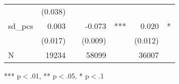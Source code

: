 \begin{table}[!h]
\begin{tabular}{lllllll}
  \multicolumn{1}{l}{} &
  \multicolumn{1}{r}{(0.038)} &
  \multicolumn{1}{l}{} \\
\multicolumn{1}{l}{sd\_pcs} &
  \multicolumn{1}{r}{0.003} &
  \multicolumn{1}{l}{} &
  \multicolumn{1}{r}{-0.073} &
  \multicolumn{1}{l}{***} &
  \multicolumn{1}{r}{0.020} &
  \multicolumn{1}{l}{*} \\
\multicolumn{1}{l}{} &
  \multicolumn{1}{r}{(0.017)} &
  \multicolumn{1}{l}{} &
  \multicolumn{1}{r}{(0.009)} &
  \multicolumn{1}{l}{} &
  \multicolumn{1}{r}{(0.012)} &
  \multicolumn{1}{l}{} \\
\multicolumn{1}{l}{N} &
  \multicolumn{1}{r}{19234} &
  \multicolumn{1}{l}{} &
  \multicolumn{1}{r}{58099} &
  \multicolumn{1}{l}{} &
  \multicolumn{1}{r}{36007} &
  \multicolumn{1}{l}{} \\
\cline{1-7}
\end{tabular}

\footnotesize{
*** p$<$.01, ** p$<$.05, * p$<$.1
}
\end{table}

